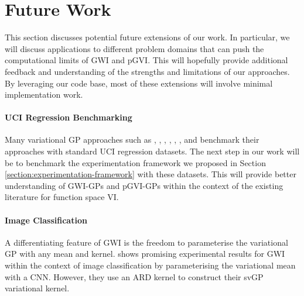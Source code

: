 \documentclass{article}
\def\code#1{\texttt{#1}}
\numberwithin{equation}{section}
\begin{document}
\newpage
\section{Future Work}\label{section:future-work}
This section discusses potential future extensions of our work. 
In particular, we will discuss applications to different problem domains that can push the computational limits of GWI and pGVI. 
This will hopefully provide additional feedback and understanding of the strengths and limitations of our approaches.
By leveraging our code base, most of these extensions will involve minimal implementation work.


\paragraph{UCI Regression Benchmarking} 
Many variational GP approaches such as \cite{wild2022generalized}, \cite{blundell2015weight}, \cite{gal2015dropout}, \cite{li2017dropout}, \cite{ma2021functional}, \cite{ma2019variational}, and \cite{sun2019functional} benchmark their approaches with standard UCI regression datasets. 
The next step in our work will be to benchmark the experimentation framework we proposed in Section \ref{section:experimentation-framework} with these datasets.
This will provide better understanding of GWI-GPs and pGVI-GPs within the context of the existing literature for function space VI.


\paragraph{Image Classification} 
A differentiating feature of GWI is the freedom to parameterise the variational GP with any mean and kernel. 
\cite{wild2022generalized} shows promising experimental results for GWI within the context of image classification by parameterising the variational mean with a CNN.
However, they use an ARD kernel to construct their svGP variational kernel.
\end{document}
